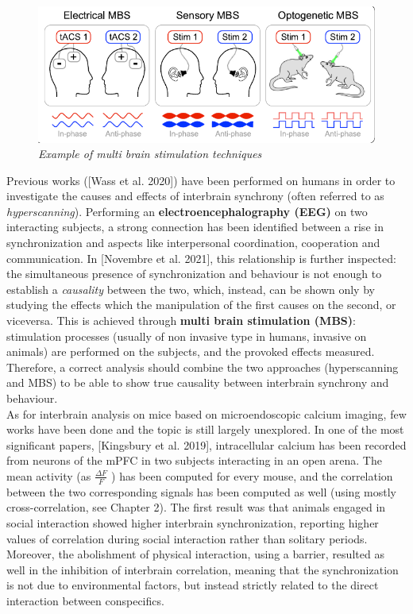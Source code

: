 \documentclass[a4paper]{article}
\begin{document}
\begin{figure}[H]
	\begin{center}
		\includegraphics[scale=.70]{novembre.png} 
	\end{center} 
	\caption{\textit{Example of multi brain stimulation techniques}}
	
\end{figure}
Previous works ([Wass et al. 2020]) have been performed on humans in order to investigate the causes and effects of interbrain synchrony (often referred to as \textit{hyperscanning}). Performing an \textbf{electroencephalography (EEG)} on two interacting subjects, a strong connection has been identified between a rise in synchronization  and aspects like interpersonal coordination, cooperation and communication. In [Novembre et al. 2021], this relationship is further inspected: the simultaneous presence of synchronization and behaviour is not enough to establish a \textit{causality} between the two, which, instead, can be shown only by studying the effects which the manipulation of the first causes on the second, or viceversa. This is achieved through \textbf{multi brain stimulation (MBS)}: stimulation processes (usually of non invasive type in humans, invasive on animals) are performed on the subjects, and the provoked effects measured. Therefore, a correct analysis should combine the two approaches (hyperscanning and MBS) to be able to show true causality between interbrain synchrony and behaviour.
\\

As for interbrain analysis on mice based on microendoscopic calcium imaging, few works have been done and the topic is still largely unexplored. In one of the most significant papers, [Kingsbury et al. 2019], intracellular calcium has been recorded from neurons of the mPFC in two subjects interacting in an open arena.  The mean activity (as $\frac{\Delta F }{F}$ ) has been computed for every mouse, and the correlation between the two corresponding signals has been computed as well (using mostly cross-correlation, see Chapter 2). The first result was that animals engaged in social interaction showed higher interbrain synchronization, reporting higher values of correlation during social interaction rather than solitary periods. Moreover, the abolishment of physical interaction, using a barrier, resulted as well in the inhibition of interbrain correlation, meaning that the synchronization is not due to environmental factors, but instead strictly related to the direct interaction between conspecifics.\\
\end{document}
